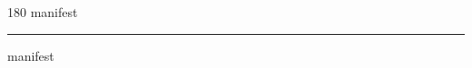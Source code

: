 
\begin{frame}
\begin{center}
\begin{turn}{180}
{\fontsize{2.5cm}{1em}\selectfont manifest}
\end{turn}
\vspace{1em}\par  
\hrule
\vspace{1em}\par  
{\fontsize{2.5cm}{1em}\selectfont manifest}
\end{center}
\end{frame}
